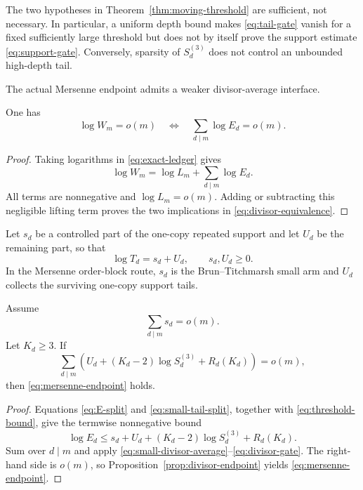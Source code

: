 The two hypotheses in Theorem~\ref{thm:moving-threshold} are sufficient,
not necessary.  In particular, a uniform depth bound makes
\eqref{eq:tail-gate} vanish for a fixed sufficiently large threshold but
does not by itself prove the support estimate \eqref{eq:support-gate}.
Conversely, sparsity of $S_d^{(3)}$ does not control an unbounded high-depth
tail.

The actual Mersenne endpoint admits a weaker divisor-average interface.

\begin{proposition}
\label{prop:divisor-endpoint}
One has
\begin{equation}
 \log W_m=o(m)
 \quad\Longleftrightarrow\quad
 \sum_{d\mid m}\log E_d=o(m).
 \label{eq:divisor-equivalence}
\end{equation}
\end{proposition}

\begin{proof}
Taking logarithms in \eqref{eq:exact-ledger} gives
\[
 \log W_m=\log L_m+\sum_{d\mid m}\log E_d.
\]
All terms are nonnegative and $\log L_m=o(m)$.  Adding or subtracting this
negligible lifting term proves the two implications in
\eqref{eq:divisor-equivalence}.
\end{proof}

Let $s_d$ be a controlled part of the one-copy repeated support and let
$U_d$ be the remaining part, so that
\begin{equation}
                  \log T_d=s_d+U_d,
  \qquad s_d,U_d\ge0.
 \label{eq:small-tail-split}
\end{equation}
In the Mersenne order-block route, $s_d$ is the Brun--Titchmarsh small arm
and $U_d$ collects the surviving one-copy support tails.

\begin{theorem}
\label{thm:divisor-gate}
Assume
\begin{equation}
                  \sum_{d\mid m}s_d=o(m).
 \label{eq:small-divisor-average}
\end{equation}
Let $K_d\ge3$.  If
\begin{equation}
 \sum_{d\mid m}\left(
   U_d+(K_d-2)\log S_d^{(3)}+R_d(K_d)
 \right)=o(m),
 \label{eq:divisor-gate}
\end{equation}
then \eqref{eq:mersenne-endpoint} holds.
\end{theorem}

\begin{proof}
Equations \eqref{eq:E-split} and \eqref{eq:small-tail-split}, together
with \eqref{eq:threshold-bound}, give the termwise nonnegative bound
\[
 \log E_d
 \le s_d+U_d+(K_d-2)\log S_d^{(3)}+R_d(K_d).
\]
Sum over $d\mid m$ and apply
\eqref{eq:small-divisor-average}--\eqref{eq:divisor-gate}.  The right-hand
side is $o(m)$, so Proposition~\ref{prop:divisor-endpoint} yields
\eqref{eq:mersenne-endpoint}.
\end{proof}

